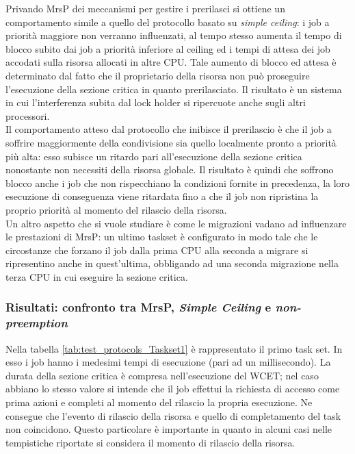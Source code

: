 \noindent Privando MrsP dei meccanismi per gestire i prerilasci si ottiene un comportamento simile a quello del protocollo basato su \textit{simple ceiling}: i job a priorità maggiore non verranno influenzati, al tempo stesso aumenta il tempo di blocco subito dai job a priorità inferiore al ceiling ed i tempi di attesa dei job accodati sulla risorsa allocati in altre CPU. Tale aumento di blocco ed attesa è determinato dal fatto che il proprietario della risorsa non può proseguire l'esecuzione della sezione critica in quanto prerilasciato. Il risultato è un sistema in cui l'interferenza subita dal lock holder si ripercuote anche sugli altri processori.\\

\noindent Il comportamento atteso dal protocollo che inibisce il prerilascio è che il job a soffrire maggiormente della condivisione sia quello localmente pronto a priorità più alta: esso subisce un ritardo pari all'esecuzione della sezione critica nonostante non necessiti della risorsa globale. Il risultato è quindi che soffrono blocco anche i job che non rispecchiano la condizioni fornite in precedenza, la loro esecuzione di conseguenza viene ritardata fino a che il job non ripristina la proprio priorità al momento del rilascio della risorsa.\\

\noindent Un altro aspetto che si vuole studiare è come le migrazioni vadano ad influenzare le prestazioni di MrsP: un ultimo taskset è configurato in modo tale che le circostanze che forzano il job dalla prima CPU alla seconda a migrare si ripresentino anche in quest'ultima, obbligando ad una seconda migrazione nella terza CPU in cui eseguire la sezione critica.

\subsubsection{Risultati: confronto tra MrsP, \textit{Simple Ceiling} e \textit{non-preemption}}
\label{sec:confronto_protocolli_ris}

Nella tabella \ref{tab:test_protocols_Taskset1} è rappresentato il primo task set. In esso i job hanno i medesimi tempi di esecuzione (pari ad un millisecondo). La durata della sezione critica è compresa nell'esecuzione del WCET; nel caso abbiano lo stesso valore si intende che il job effettui la richiesta di accesso come prima azioni e completi al momento del rilascio la propria esecuzione. Ne consegue che l'evento di rilascio della risorsa e quello di completamento del task non coincidono. Questo particolare è importante in quanto in alcuni casi nelle tempistiche riportate si considera il momento di rilascio della risorsa.\\


